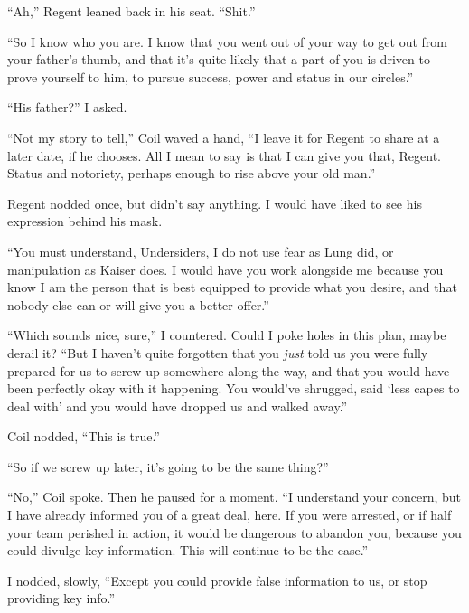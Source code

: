 ``Ah,'' Regent leaned back in his seat.  ``Shit.''



``So I know who you are.  I know that you went out of your way to get out from your father's thumb, and that it's quite likely that a part of you is driven to prove yourself to him, to pursue success, power and status in our circles.''



``His father?'' I asked.



``Not my story to tell,'' Coil waved a hand, ``I leave it for Regent to share at a later date, if he chooses.  All I mean to say is that I can give you that, Regent.  Status and notoriety, perhaps enough to rise above your old man.''



Regent nodded once, but didn't say anything.  I would have liked to see his expression behind his mask.



``You must understand, Undersiders, I do not use fear as Lung did, or manipulation as Kaiser does.  I would have you work alongside me because you know I am the person that is best equipped to provide what you desire, and that nobody else can or will give you a better offer.''



``Which sounds nice, sure,'' I countered.  Could I poke holes in this plan, maybe derail it? ``But I haven't quite forgotten that you \emph{just} told us you were fully prepared for us to screw up somewhere along the way, and that you would have been perfectly okay with it happening.  You would've shrugged, said `less capes to deal with' and you would have dropped us and walked away.''



Coil nodded, ``This is true.''



``So if we screw up later, it's going to be the same thing?''



``No,'' Coil spoke. Then he paused for a moment.  ``I understand your concern, but I have already informed you of a great deal, here.  If you were arrested, or if half your team perished in action, it would be dangerous to abandon you, because you could divulge key information.  This will continue to be the case.''



I nodded, slowly, ``Except you could provide false information to us, or stop providing key info.''



